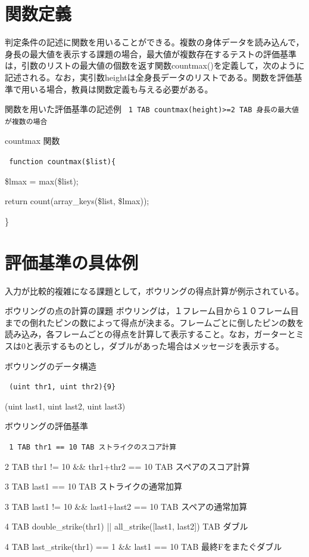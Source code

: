 \documentclass{tpu-sotu}
\begin{document}
\section{関数定義}
判定条件の記述に関数を用いることができる。複数の身体データを読み込んで，身長の最大値を表示する課題の場合，最大値が複数存在するテストの評価基準は，引数のリストの最大値の個数を返す関数countmax()を定義して，次のように記述される。なお，実引数heightは全身長データのリストである。関数を評価基準で用いる場合，教員は関数定義も与える必要がある。\\
\begin{minipage}[b]{\textwidth}
\begin{itembox}[l]{関数を用いた評価基準の記述例}
{\tt
1 TAB countmax(height)>=2 TAB 身長の最大値が複数の場合
}
\end{itembox}
\end{minipage}
\begin{minipage}[b]{\textwidth}
\begin{itembox}[l]{countmax 関数}
{\tt
function countmax(\$list)\{

	\$lmax = max(\$list);

	return count(array\_keys(\$list, \$lmax));

\}
}
\end{itembox}
\end{minipage}

\section{評価基準の具体例}
入力が比較的複雑になる課題として，ボウリングの得点計算が例示されている。
\begin{itembox}[l]{ボウリングの点の計算の課題}
ボウリングは，１フレーム目から１０フレーム目までの倒れたピンの数によって得点が決まる。フレームごとに倒したピンの数を読み込み，各フレームごとの得点を計算して表示すること。なお，ガーターとミスは0と表示するものとし，ダブルがあった場合はメッセージを表示する。
\end{itembox}
\begin{minipage}[b]{\textwidth}
\begin{itembox}[l]{ボウリングのデータ構造}
{\tt
(uint thr1, uint thr2)\{9\}

(uint last1, uint last2, uint last3)
}
\end{itembox}
\end{minipage}
\begin{itembox}[l]{ボウリングの評価基準}
{\tt
1 TAB thr1 == 10 TAB ストライクのスコア計算

2 TAB thr1 != 10 \&\& thr1+thr2 == 10 TAB スペアのスコア計算

3 TAB last1 == 10 TAB ストライクの通常加算

3 TAB last1 != 10  \&\& last1+last2 == 10 TAB スペアの通常加算

4 TAB double\_strike(thr1) || all\_strike([last1, last2]) TAB ダブル

4 TAB last\_strike(thr1) == 1 \&\& last1 == 10 TAB 最終Fをまたぐダブル
}
\end{itembox}
\end{document}
